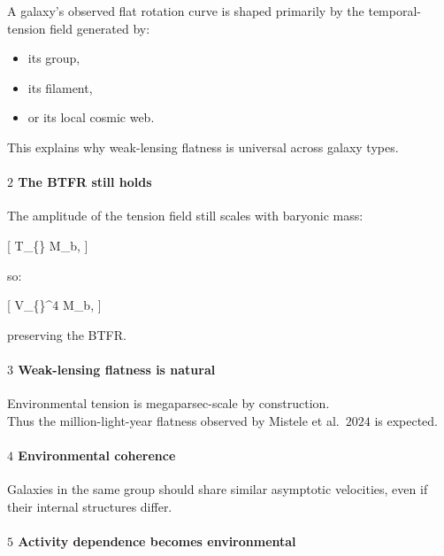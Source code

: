 A galaxy's observed flat rotation curve is shaped primarily by the
temporal-tension field generated by:

\begin{itemize}
\tightlist
\item
  its group,
\item
  its filament,
\item
  or its local cosmic web.
\end{itemize}

This explains why weak-lensing flatness is universal across galaxy
types.

\paragraph{\texorpdfstring{\textbf{\(2\) The BTFR still
holds}}{2 The BTFR still holds}}\label{the-btfr-still-holds}

The amplitude of the tension field still scales with baryonic mass:

{[} T\_\{\} \propto M\_b,  {]}

so:

{[} V\_\{\}\^{}4 \propto M\_b,  {]}

preserving the BTFR.

\paragraph{\texorpdfstring{\textbf{\(3\) Weak-lensing flatness is
natural}}{3 Weak-lensing flatness is natural}}\label{weak-lensing-flatness-is-natural}

Environmental tension is megaparsec-scale by construction.\\
Thus the million-light-year flatness observed by Mistele et al.~\(2024\)
is expected.

\paragraph{\texorpdfstring{\textbf{\(4\) Environmental
coherence}}{4 Environmental coherence}}\label{environmental-coherence}

Galaxies in the same group should share similar asymptotic velocities,
even if their internal structures differ.

\paragraph{\texorpdfstring{\textbf{\(5\) Activity dependence becomes
environmental}}{5 Activity dependence becomes environmental}}\label{activity-dependence-becomes-environmental}

